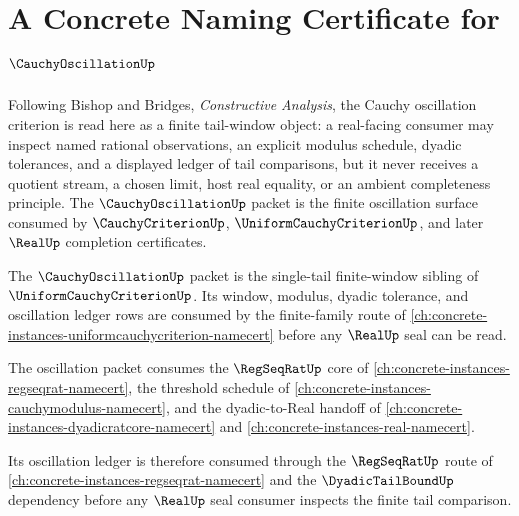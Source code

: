 \chapter{A Concrete Naming Certificate for $\CauchyOscillationUp$}
\label{ch:concrete-instances-cauchyoscillation-namecert}

Following Bishop and Bridges, \emph{Constructive Analysis}, the Cauchy oscillation criterion is read here as a finite tail-window object: a real-facing consumer may inspect named rational observations, an explicit modulus schedule, dyadic tolerances, and a displayed ledger of tail comparisons, but it never receives a quotient stream, a chosen limit, host real equality, or an ambient completeness principle. The $\CauchyOscillationUp$ packet is the finite oscillation surface consumed by $\CauchyCriterionUp$, $\UniformCauchyCriterionUp$, and later $\RealUp$ completion certificates.

The $\CauchyOscillationUp$ packet is the single-tail finite-window sibling of $\UniformCauchyCriterionUp$. Its window, modulus, dyadic tolerance, and oscillation ledger rows are consumed by the finite-family route of \autoref{ch:concrete-instances-uniformcauchycriterion-namecert} before any $\RealUp$ seal can be read.

The oscillation packet consumes the $\RegSeqRatUp$ core of \autoref{ch:concrete-instances-regseqrat-namecert}, the threshold schedule of \autoref{ch:concrete-instances-cauchymodulus-namecert}, and the dyadic-to-Real handoff of \autoref{ch:concrete-instances-dyadicratcore-namecert} and \autoref{ch:concrete-instances-real-namecert}.

Its oscillation ledger is therefore consumed through the $\RegSeqRatUp$ route of \autoref{ch:concrete-instances-regseqrat-namecert} and the $\DyadicTailBoundUp$ dependency before any $\RealUp$ seal consumer inspects the finite tail comparison.

